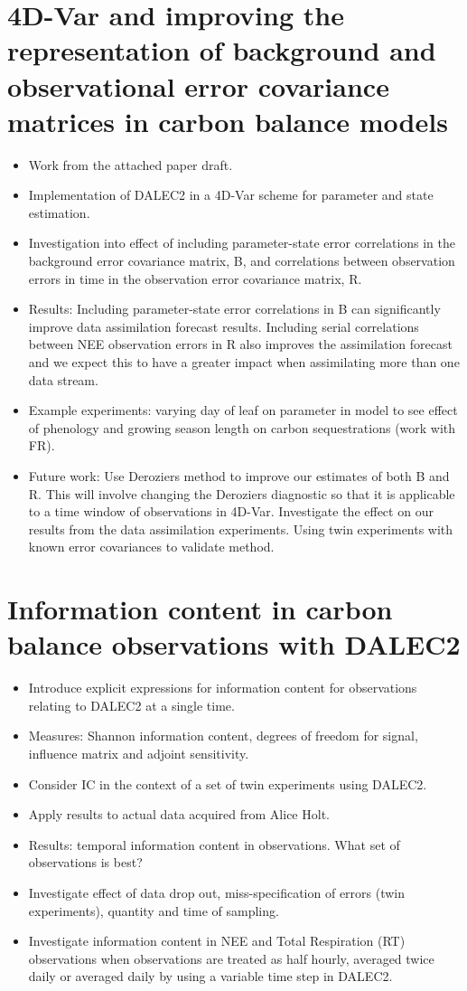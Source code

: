\documentclass[11pt]{article}
\begin{document}
\section{4D-Var and improving the representation of background and observational error covariance matrices in carbon balance models}
\begin{itemize}
\item Work from the attached paper draft.
\item Implementation of DALEC2 in a 4D-Var scheme for parameter and state estimation.
\item Investigation into effect of including parameter-state error correlations in the background error covariance matrix, B, and correlations between observation errors in time in the observation error covariance matrix, R.
\item Results: Including parameter-state error correlations in B can significantly improve data assimilation forecast results. Including serial correlations between NEE observation errors in R also improves the assimilation forecast and we expect this to have a greater impact when assimilating more than one data stream.
\item Example experiments: varying day of leaf on parameter in model to see effect of phenology and growing season length on carbon sequestrations (work with FR).
\item Future work: Use Deroziers method to improve our estimates of both B and R. This will involve changing the Deroziers diagnostic so that it is applicable to a time window of observations in 4D-Var. Investigate the effect on our results from the data assimilation experiments. Using twin experiments with known error covariances to validate method.
\end{itemize}


\section{Information content in carbon balance observations with DALEC2}
\begin{itemize}
\item Introduce explicit expressions for information content for observations relating to DALEC2 at a single time.
\item Measures: Shannon information content, degrees of freedom for signal, influence matrix and adjoint sensitivity.
\item Consider IC in the context of a set of twin experiments using DALEC2.
\item Apply results to actual data acquired from Alice Holt.
\item Results: temporal information content in observations. What set of observations is best?
\item Investigate effect of data drop out, miss-specification of errors (twin experiments), quantity and time of sampling.
\item Investigate information content in NEE and Total Respiration (RT) observations when observations are treated as half hourly, averaged twice daily or averaged daily by using a variable time step in DALEC2.   
\end{itemize}
\end{document}
